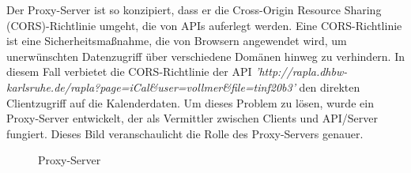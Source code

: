Der Proxy-Server ist so konzipiert, dass er die Cross-Origin Resource Sharing (CORS)-Richtlinie umgeht, die von APIs auferlegt werden. Eine CORS-Richtlinie ist eine Sicherheitsmaßnahme, die von Browsern angewendet wird, um  unerwünschten Datenzugriff über verschiedene Domänen hinweg zu verhindern. In diesem Fall verbietet die CORS-Richtlinie der API \emph{'http://rapla.dhbw-karlsruhe.de/rapla?page=iCal\&user=vollmer\&file=tinf20b3'} den direkten Clientzugriff auf die Kalenderdaten. Um dieses Problem zu lösen, wurde ein Proxy-Server entwickelt, der als Vermittler zwischen Clients und API/Server fungiert. Dieses Bild veranschaulicht die Rolle des Proxy-Servers genauer.
\begin{figure}[htbp]
	\centering
	\caption{Proxy-Server}
\end{figure}

